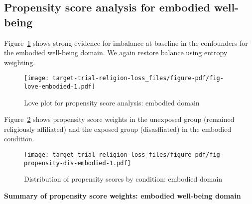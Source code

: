 \documentclass[
  singlecolumn]{report}
\begin{document}
\hypertarget{propensity-score-analysis-for-embodied-well-being}{%
\subsection{Propensity score analysis for embodied
well-being}\label{propensity-score-analysis-for-embodied-well-being}}

Figure~\ref{fig-love-embodied} shows strong evidence for imbalance at
baseline in the confounders for the embodied well-being domain. We again
restore balance using entropy weighting.

\begin{figure}

{\centering \texttt{[image: target-trial-religion-loss\_files/figure-pdf/fig-love-embodied-1.pdf]}

}

\caption{\label{fig-love-embodied}Love plot for propensity score
analysis: embodied domain}

\end{figure}

Figure~\ref{fig-propensity-dis-embodied} shows propensity score weights
in the unexposed group (remained religiously affiliated) and the exposed
group (disasffiated) in the embodied condition.

\begin{figure}

{\centering \texttt{[image: target-trial-religion-loss\_files/figure-pdf/fig-propensity-dis-embodied-1.pdf]}

}

\caption{\label{fig-propensity-dis-embodied}Distribution of propensity
scores by condition: embodied domain}

\end{figure}

\textbf{Summary of propensity score weights: embodied well-being domain}
\end{document}

